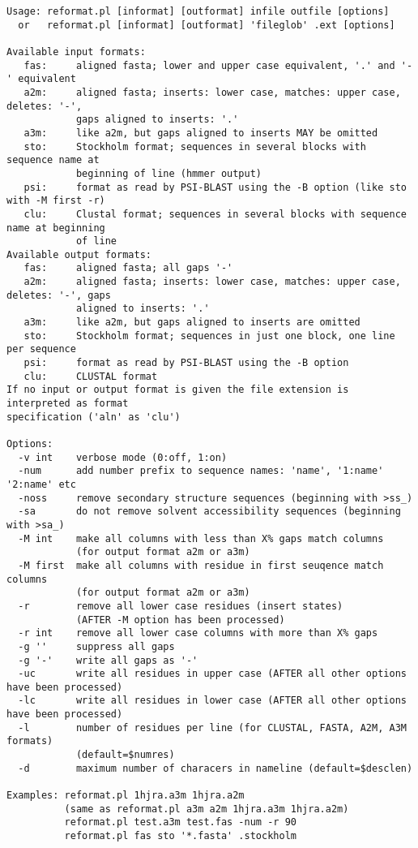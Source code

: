 \documentclass[11pt,a4paper]{article}
\begin{document}
\small \begin{verbatim}
Usage: reformat.pl [informat] [outformat] infile outfile [options] 
  or   reformat.pl [informat] [outformat] 'fileglob' .ext [options] 

Available input formats:
   fas:     aligned fasta; lower and upper case equivalent, '.' and '-' equivalent
   a2m:     aligned fasta; inserts: lower case, matches: upper case, deletes: '-',
            gaps aligned to inserts: '.'
   a3m:     like a2m, but gaps aligned to inserts MAY be omitted
   sto:     Stockholm format; sequences in several blocks with sequence name at 
            beginning of line (hmmer output)
   psi:     format as read by PSI-BLAST using the -B option (like sto with -M first -r)
   clu:     Clustal format; sequences in several blocks with sequence name at beginning 
            of line
Available output formats:
   fas:     aligned fasta; all gaps '-'
   a2m:     aligned fasta; inserts: lower case, matches: upper case, deletes: '-', gaps 
            aligned to inserts: '.'
   a3m:     like a2m, but gaps aligned to inserts are omitted
   sto:     Stockholm format; sequences in just one block, one line per sequence
   psi:     format as read by PSI-BLAST using the -B option 
   clu:     CLUSTAL format
If no input or output format is given the file extension is interpreted as format 
specification ('aln' as 'clu')

Options:
  -v int    verbose mode (0:off, 1:on)
  -num      add number prefix to sequence names: 'name', '1:name' '2:name' etc
  -noss     remove secondary structure sequences (beginning with >ss_)
  -sa       do not remove solvent accessibility sequences (beginning with >sa_)
  -M int    make all columns with less than X% gaps match columns 
            (for output format a2m or a3m)
  -M first  make all columns with residue in first seuqence match columns 
            (for output format a2m or a3m)
  -r        remove all lower case residues (insert states) 
            (AFTER -M option has been processed)
  -r int    remove all lower case columns with more than X% gaps
  -g ''     suppress all gaps
  -g '-'    write all gaps as '-'
  -uc       write all residues in upper case (AFTER all other options have been processed)
  -lc       write all residues in lower case (AFTER all other options have been processed)
  -l        number of residues per line (for CLUSTAL, FASTA, A2M, A3M formats) 
            (default=$numres)
  -d        maximum number of characers in nameline (default=$desclen)

Examples: reformat.pl 1hjra.a3m 1hjra.a2m  
          (same as reformat.pl a3m a2m 1hjra.a3m 1hjra.a2m)
          reformat.pl test.a3m test.fas -num -r 90
          reformat.pl fas sto '*.fasta' .stockholm
\end{verbatim} \normalsize
\end{document}
